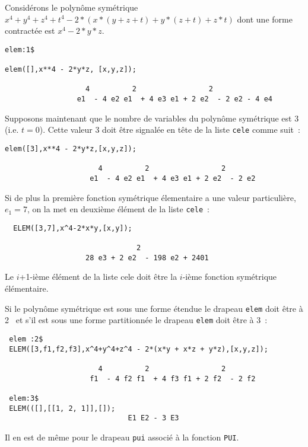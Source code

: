 Consid\'erons le polyn\^ome sym\'etrique 
$x^4+y^4+z^4+t^4 - 2*(x*(y + z +t) + y*(z + t) + z*t)$
dont une forme contract\'ee est $x^4 -2*y*z$.
\small
\begin{verbatim}
elem:1$

elem([],x**4 - 2*y*z, [x,y,z]); 

                   4          2                 2
                 e1  - 4 e2 e1  + 4 e3 e1 + 2 e2  - 2 e2 - 4 e4
\end{verbatim}
\normalsize
Supposons maintenant que le nombre de variables du polyn\^ome
sym\'etrique est 3 (i.e. $t=0$). Cette valeur 3 doit \^etre signal\'ee
en t\^ete de la liste {\tt cele} comme suit~:
\small
\begin{verbatim}
elem([3],x**4 - 2*y*z,[x,y,z]);

                      4          2                 2
                    e1  - 4 e2 e1  + 4 e3 e1 + 2 e2  - 2 e2
\end{verbatim}
\normalsize
Si de plus la premi\`ere fonction sym\'etrique \'elementaire
a une valeur particuli\`ere, $e_1=7$, on la met en deuxi\`eme
\'el\'ement de la liste {\tt cele}~:
\small
\begin{verbatim}
  ELEM([3,7],x^4-2*x*y,[x,y]);

                               2
                   28 e3 + 2 e2  - 198 e2 + 2401
\end{verbatim}
\normalsize
Le $i$+1-i\`eme \'el\'ement de la liste cele doit \^etre la $i$-i\`eme
fonction sym\'etrique \'el\'ementaire.

Si le  polyn\^{o}me sym\'{e}trique est sous une forme \'etendue
le drapeau {\tt elem} doit \^{e}tre \`{a} 2~ et s'il est 
sous une forme partitionn\'ee le drapeau {\tt elem} doit \^{e}tre \`{a} 3~:\\

\small
\begin{verbatim}
 elem :2$
 ELEM([3,f1,f2,f3],x^4+y^4+z^4 - 2*(x*y + x*z + y*z),[x,y,z]);

                      4          2                 2
                    f1  - 4 f2 f1  + 4 f3 f1 + 2 f2  - 2 f2

 elem:3$
 ELEM(([],[[1, 2, 1]],[]);
                             E1 E2 - 3 E3
\end{verbatim}
\normalsize

Il en est de m\^{e}me pour le drapeau {\tt pui} associ\'e \`a la fonction
{\tt PUI}.\\

